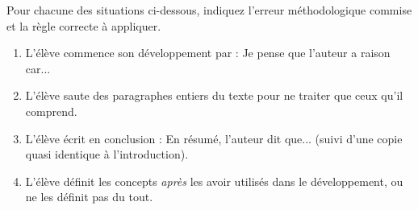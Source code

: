 \documentclass[11pt]{article}
\begin{document}
\begin{exercice}
Pour chacune des situations ci-dessous, indiquez l'erreur méthodologique commise et la règle correcte à appliquer.
\begin{enumerate}
    \item L'élève commence son développement par : \og Je pense que l'auteur a raison car...\fg
    \item L'élève saute des paragraphes entiers du texte pour ne traiter que ceux qu'il comprend.
    \item L'élève écrit en conclusion : \og En résumé, l'auteur dit que... \fg{} (suivi d'une copie quasi identique à l'introduction).
    \item L'élève définit les concepts \textit{après} les avoir utilisés dans le développement, ou ne les définit pas du tout.
\end{enumerate}
\end{exercice}
\end{document}

